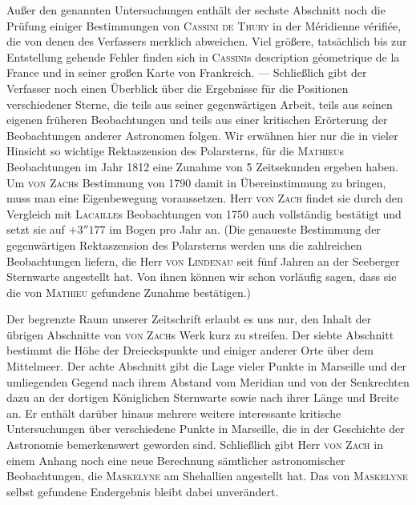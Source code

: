 Außer den genannten Untersuchungen enthält der sechste Abschnitt noch die Prüfung einiger Bestimmungen von \textsc{Cassini de Thury} in der Méridienne vérifiée, die von denen des Verfassers merklich abweichen. Viel größere, tatsächlich bis zur Entstellung gehende Fehler finden sich in \textsc{Cassini}s description géometrique de la France und in seiner großen Karte von Frankreich. --- Schließlich gibt der Verfasser noch einen Überblick über die Ergebnisse für die Positionen verschiedener Sterne, die teils aus seiner gegenwärtigen Arbeit, teils aus seinen eigenen früheren Beobachtungen und teils aus einer kritischen Erörterung der Beobachtungen anderer Astronomen folgen. Wir erwähnen hier nur die in vieler Hinsicht so wichtige Rektaszension des Polarsterns, für die \textsc{Mathieu}s Beobachtungen im Jahr 1812 eine Zunahme von 5 Zeitsekunden ergeben haben. Um \textsc{von Zach}s Bestimmung von 1790 damit in Übereinstimmung zu bringen, muss man eine Eigenbewegung voraussetzen. Herr \textsc{von Zach} findet sie durch den Vergleich mit \textsc{Lacaille}s Beobachtungen von 1750 auch vollständig bestätigt und setzt sie auf $+3''177$ im Bogen pro Jahr an. (Die genaueste Bestimmung der gegenwärtigen Rektaszension des Polarsterns werden uns die zahlreichen Beobachtungen liefern, die Herr \textsc{von Lindenau} seit fünf Jahren an der Seeberger Sternwarte angestellt hat. Von ihnen können wir schon vorläufig sagen, dass sie die von \textsc{Mathieu} gefundene Zunahme bestätigen.)

Der begrenzte Raum unserer Zeitschrift erlaubt es uns nur, den Inhalt der übrigen Abschnitte von \textsc{von Zach}s Werk kurz zu streifen. Der siebte Abschnitt bestimmt die Höhe der Dreieckspunkte und einiger anderer Orte über dem Mittelmeer. Der achte Abschnitt gibt die Lage vieler Punkte in Marseille und der umliegenden Gegend nach ihrem Abstand vom Meridian und von der Senkrechten dazu an der dortigen Königlichen Sternwarte sowie nach ihrer Länge und Breite an. Er enthält darüber hinaus mehrere weitere interessante kritische Untersuchungen über verschiedene Punkte in Marseille, die in der Geschichte der Astronomie bemerkenswert geworden sind. Schließlich gibt Herr \textsc{von Zach} in einem Anhang noch eine neue Berechnung sämtlicher astronomischer Beobachtungen, die \textsc{Maskelyne} am Shehallien angestellt hat. Das von \textsc{Maskelyne} selbst gefundene Endergebnis bleibt dabei unverändert.
